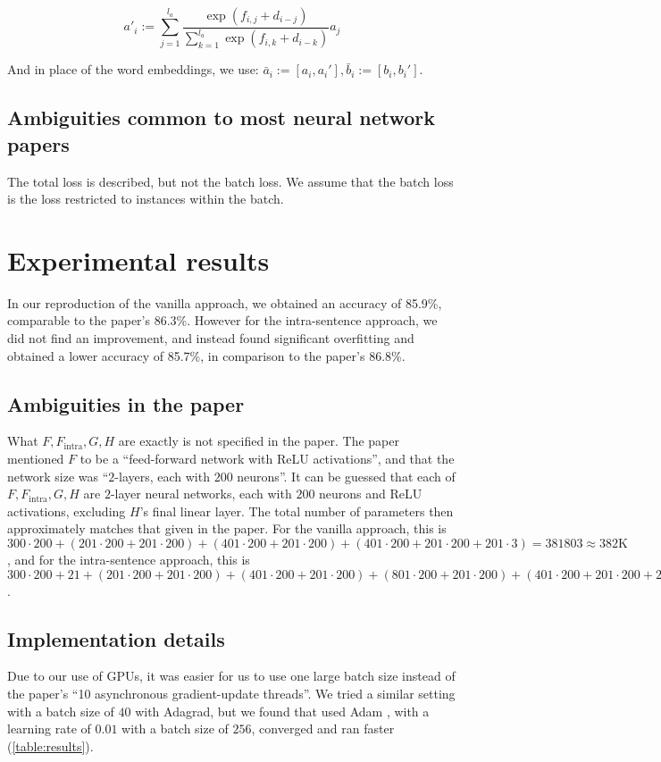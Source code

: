 \documentclass{article}
\begin{document}
\[a'_i := \sum_{j=1}^{l_a} \frac{\exp(f_{i,j} + d_{i-j})}{\sum_{k=1}^{l_a} \exp(f_{i,k} + d_{i-k})} a_j\]

And in place of the word embeddings, we use: $\bar{a}_i := [a_i, a_i'], \bar{b}_i := [b_i, b_i']$.

\subsection{Ambiguities common to most neural network papers}
The total loss is described, but not the batch loss. We assume that the batch loss is the loss restricted to instances within the batch.

\section{Experimental results}
In our reproduction of the vanilla approach, we obtained an accuracy of 85.9\%, comparable to the paper's 86.3\%. However for the intra-sentence approach, we did not find an improvement, and instead found significant overfitting and obtained a lower accuracy of 85.7\%, in comparison to the paper's 86.8\%.

\subsection{Ambiguities in the paper}
What $F, F_\text{intra}, G, H$ are exactly is not specified in the paper. The paper mentioned $F$ to be a ``feed-forward network with ReLU activations'', and that the network size was ``$2$-layers, each with $200$ neurons''. It can be guessed that each of $F, F_\text{intra}, G, H$ are $2$-layer neural networks, each with $200$ neurons and ReLU activations, excluding $H$'s final linear layer. The total number of parameters then approximately matches that given in the paper. For the vanilla approach, this is $300 \cdot 200 + (201 \cdot 200 + 201 \cdot 200) + (401 \cdot 200 + 201 \cdot 200) + (401 \cdot 200 + 201 \cdot 200 + 201 \cdot 3) = 381803 \approx 382\text{K}$, and for the intra-sentence approach, this is $300 \cdot 200 + 21 + (201 \cdot 200 + 201 \cdot 200) + (401 \cdot 200 + 201 \cdot 200) + (801 \cdot 200 + 201 \cdot 200) + (401 \cdot 200 + 201 \cdot 200 + 201 \cdot 3) = 582224 \approx 582\text{K}$.

\subsection{Implementation details}
Due to our use of GPUs, it was easier for us to use one large batch size instead of the paper's ``10 asynchronous gradient-update threads''. We tried a similar setting with a batch size of $40$ with Adagrad, but we found that used Adam \citep{kingma_adam:_2014}, with a learning rate of $0.01$ with a batch size of $256$, converged and ran faster (\autoref{table:results}).
\end{document}
